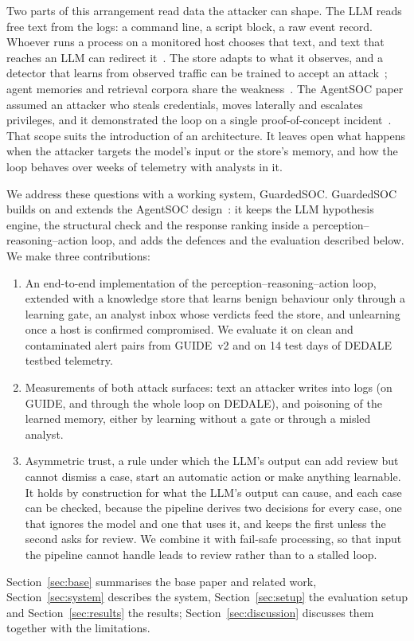 \documentclass[conference]{IEEEtran}
\begin{document}
Two parts of this arrangement read data the attacker can shape. The LLM reads free text from the logs: a command
line, a script block, a raw event record. Whoever runs a process on a monitored host chooses that text, and text
that reaches an LLM can redirect it~\cite{perez,greshake,liu}. The store adapts to what it observes, and a detector
that learns from observed traffic can be trained to accept an attack~\cite{antidote}; agent memories and retrieval
corpora share the weakness~\cite{agentpoison,poisonedrag}. The AgentSOC paper assumed an attacker who steals
credentials, moves laterally and escalates privileges, and it demonstrated the loop on a single proof-of-concept
incident~\cite{agentsoc}. That scope suits the introduction of an architecture. It leaves open what happens when
the attacker targets the model's input or the store's memory, and how the loop behaves over weeks of telemetry
with analysts in it.

We address these questions with a working system, GuardedSOC. GuardedSOC builds on and extends the AgentSOC
design~\cite{agentsoc}: it keeps the LLM hypothesis engine, the structural check and the response ranking inside a
perception--reasoning--action loop, and adds the defences and the evaluation described below. We make three
contributions:
\begin{enumerate}
\item An end-to-end implementation of the perception--reasoning--action loop, extended with a knowledge store that
learns benign behaviour only through a learning gate, an analyst inbox whose verdicts feed the store, and
unlearning once a host is confirmed compromised. We evaluate it on clean and contaminated alert pairs from GUIDE~v2
and on 14 test days of DEDALE testbed telemetry.
\item Measurements of both attack surfaces: text an attacker writes into logs (on GUIDE, and through the whole loop
on DEDALE), and poisoning of the learned memory, either by learning without a gate or through a misled analyst.
\item Asymmetric trust, a rule under which the LLM's output can add review but cannot dismiss a case, start an
automatic action or make anything learnable. It holds by construction for what the LLM's output can cause, and each
case can be checked, because the pipeline derives two decisions for every case, one that ignores the model and one
that uses it, and keeps the first unless the second asks for review. We combine it with fail-safe processing, so that input the
pipeline cannot handle leads to review rather than to a stalled loop.
\end{enumerate}
Section~\ref{sec:base} summarises the base paper and related work, Section~\ref{sec:system} describes the system,
Section~\ref{sec:setup} the evaluation setup and Section~\ref{sec:results} the results;
Section~\ref{sec:discussion} discusses them together with the limitations.
\end{document}
